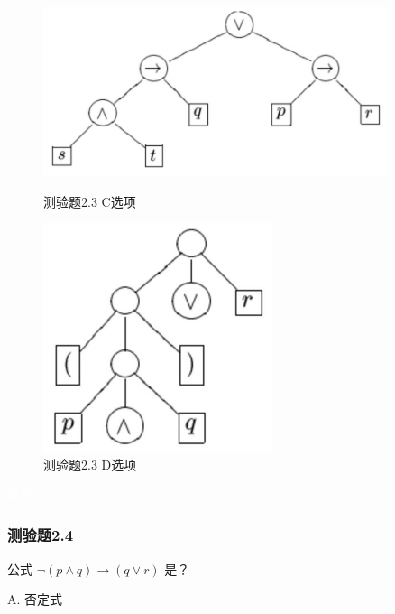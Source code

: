 \documentclass[UTF8, heading=true]{ctexart}
\begin{document}
\clearpage

\begin{figure}[H]
  \centering
  \begin{minipage}[t]{0.45\textwidth}
      \centering
      \includegraphics[width=0.9\textwidth]{2.3_3.jpg} %
      \caption{测验题2.3 C选项}
  \end{minipage}
  \hfill
  \begin{minipage}[t]{0.45\textwidth}
      \centering
      \includegraphics[width=0.6\textwidth]{2.3_4.jpg} %
      \caption{测验题2.3 D选项}
\end{minipage}
\end{figure}

\textcolor{white}{答案：C}



\subsubsection{测验题2.4}

公式 $\neg(p \wedge q) \rightarrow(q \vee r)$ 是？

A. 否定式
\end{document}
